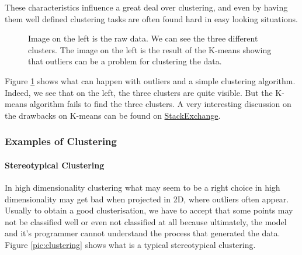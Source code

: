 These characteristics influence a great deal over clustering, and even by having them well defined clustering tasks are often found hard in easy looking situations.

\begin{figure}[H] %
\centerline{
}
\caption{\label{pic:clustering_outliers} 
Image on the left is the raw data. We can see the three different clusters. The image on the left is the result of the K-means showing that outliers can be a problem for clustering the data.
}
\end{figure}

Figure \ref{pic:clustering_outliers} shows what can happen with outliers and a simple clustering algorithm. Indeed, we see that on the left, the three clusters are quite visible. But the K-means algorithm fails to find the three clusters. A very interesting discussion on the drawbacks on K-means can be found on \href{http://stats.stackexchange.com/questions/133656/how-to-understand-the-drawbacks-of-k-means}{StackExchange}.

\subsubsection{Examples of Clustering}

\paragraph{Stereotypical Clustering}
In high dimensionality clustering what may seem to be a right choice in high dimensionality may get bad when projected in 2D, where outliers often appear. Usually to obtain a good clusterisation, we have to accept that some points may not be classified well or even not classified at all because ultimately, the model and it's programmer cannot understand the process that generated the data. Figure \ref{pic:clustering} shows what is a typical stereotypical clustering. 

